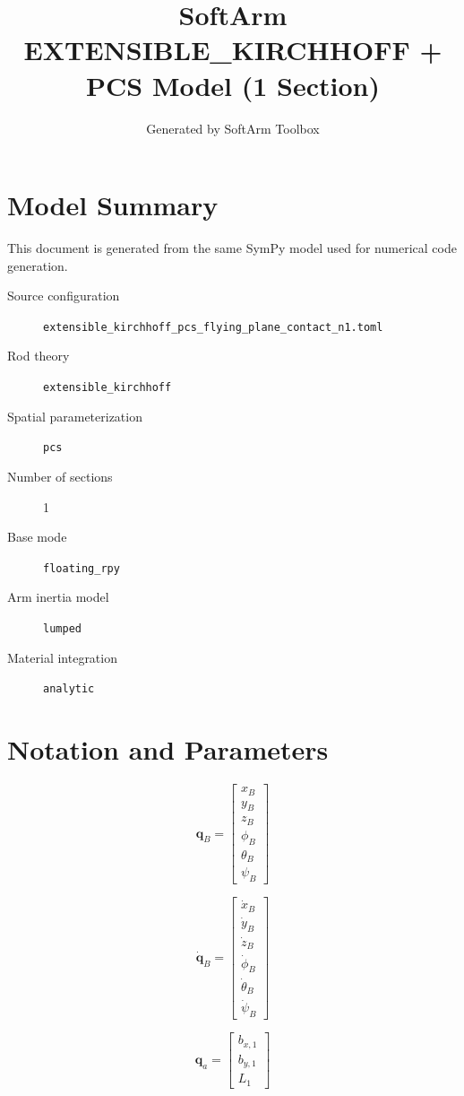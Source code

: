 \documentclass[11pt]{article}
\title{SoftArm EXTENSIBLE\_KIRCHHOFF + PCS Model (1 Section)}
\author{Generated by SoftArm Toolbox}
\date{}
\begin{document}
\maketitle

\section{Model Summary}
This document is generated from the same SymPy model used for numerical code generation.
\begin{description}
\item[Source configuration] \texttt{extensible\_kirchhoff\_pcs\_flying\_plane\_contact\_n1.toml}
\item[Rod theory] \texttt{extensible\_kirchhoff}
\item[Spatial parameterization] \texttt{pcs}
\item[Number of sections] 1
\item[Base mode] \texttt{floating\_rpy}
\item[Arm inertia model] \texttt{lumped}
\item[Material integration] \texttt{analytic}
\end{description}

\section{Notation and Parameters}
\begin{equation}
\boldsymbol q_B=\begin{bmatrix}x_B\\y_B\\z_B\\\phi_B\\\theta_B\\\psi_B\end{bmatrix}
\end{equation}

\begin{equation}
\dot{\boldsymbol q}_B=\begin{bmatrix}\dot{x}_B\\\dot{y}_B\\\dot{z}_B\\\dot{\phi}_B\\\dot{\theta}_B\\\dot{\psi}_B\end{bmatrix}
\end{equation}

\begin{equation}
\boldsymbol q_a=\begin{bmatrix}b_{x,1}\\b_{y,1}\\L_{1}\end{bmatrix}
\end{equation}
\end{document}
